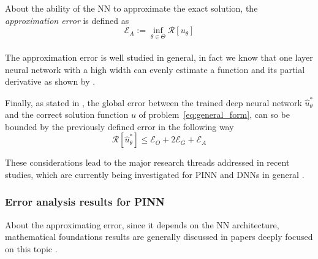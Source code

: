 \documentclass[pdflatex,sn-basic]{sn-jnl}%
\theoremstyle{thmstyleone}%
\theoremstyle{thmstyletwo}%
\theoremstyle{thmstylethree}%
\begin{document}
About the ability of the NN to approximate the exact solution, the \emph{approximation error} is defined as
\begin{equation*}
\mathcal{E}_A :=
\inf_{\theta \in \Theta}\mathcal{R}[u_\theta]
\end{equation*}
\\
The approximation error is well studied in general, in fact we know that
one layer neural network with a high width can evenly estimate a function and its partial derivative as shown by \cite{Pin1999_ApproximationTheoryMlp_Pin}.


Finally, as stated in \cite{Kut2022_MathematicsArtificialIntelligence_Kut}, 
the global error between the trained deep neural network $\hat{u}_\theta^*$ and the correct solution function $u$ of problem~\eqref{eq:general_form}, can so be bounded by the previously defined error in the following way
\begin{equation} \label{eq:error}
\mathcal{R}[\hat{u}_\theta^*] 
\leq
\mathcal{E}_O
+
2 \mathcal{E}_G
+
\mathcal{E}_A
\end{equation}



These considerations lead to the major research threads addressed in recent studies, which are currently being investigated for PINN and DNNs in general  \cite{Kut2022_MathematicsArtificialIntelligence_Kut}.


\subsubsection{Error analysis results for PINN}




About the approximating error,
since it depends on the NN architecture, mathematical foundations results are generally discussed in papers deeply focused on this topic \cite{Cal2020_UniversalApproximators_Cal, Elb2021_DeepNeuralNetwork_PerEPGB}.
\end{document}
